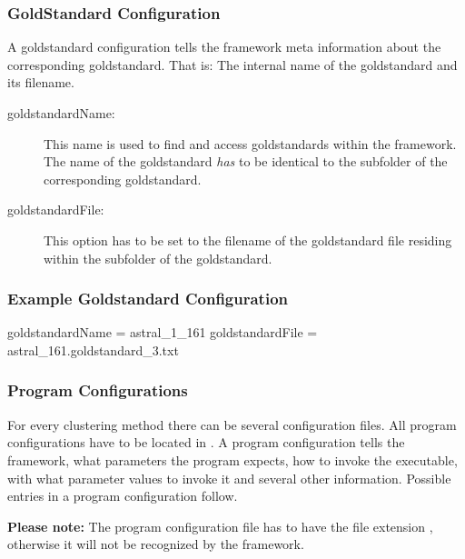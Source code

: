 			\subsubsection{GoldStandard Configuration} \label{subsubsec:gsconfigs}
			A goldstandard configuration tells the framework meta information about the corresponding goldstandard. That is: The internal name of the goldstandard and its filename.
			
			\begin{description}
			\item[goldstandardName:] \label{para:goldstandardName}
			This name is used to find and access goldstandards within the framework. The name of the goldstandard \textit{has} to be identical to the subfolder of the corresponding goldstandard.
			\item[goldstandardFile:] \label{para:goldstandardFile}
			This option has to be set to the filename of the goldstandard file residing within the subfolder of the goldstandard.
			\end{description}
	
			\subsubsection{Example Goldstandard Configuration}
			
			\begin{listing}{1}
goldstandardName = astral_1_161
goldstandardFile = astral_161.goldstandard_3.txt \end{listing}
			
	

		\subsubsection{Program Configurations} \label{subsec_programconfigs}
		For every clustering method there can be several configuration files. All program configurations have to be located in \highlight{\repoprogramconfigs}. A program configuration tells the framework, what parameters the program expects, how to invoke the executable, with what parameter values to invoke it and several other information. Possible entries in a program configuration follow.
		
		\textbf{Please note:} The program configuration file has to have the file extension , otherwise it will not be recognized by the framework.
		
